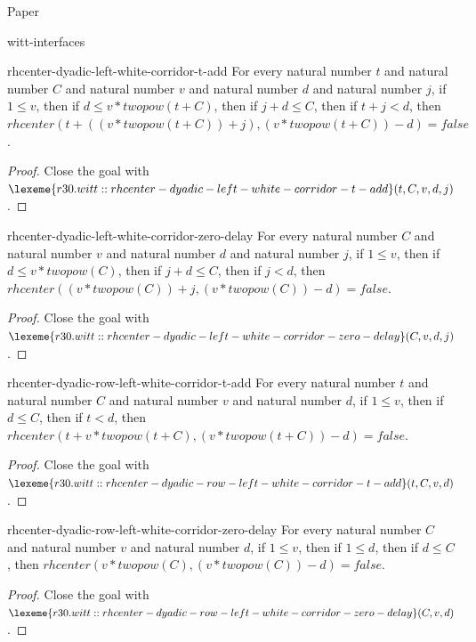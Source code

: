 \begin{lexlean}{Paper}
\begin{section}{witt-interfaces}
  \begin{theorem}{rhcenter-dyadic-left-white-corridor-t-add}
  For every natural number \(t\) and natural number \(C\) and natural number \(v\) and natural number \(d\) and natural number \(j\), if \(1 ≤ v\), then if \(d ≤ v * twopow(t + C)\), then if \(j + d ≤ C\), then if \(t + j < d\), then \(rhcenter(t + ((v * twopow(t + C)) + j), (v * twopow(t + C)) - d) = false\).
  \begin{proof}
  Close the goal with \(\lexeme{r30.witt::rhcenter-dyadic-left-white-corridor-t-add}(t, C, v, d, j)\).
  \end{proof}
  \end{theorem}

  \begin{theorem}{rhcenter-dyadic-left-white-corridor-zero-delay}
  For every natural number \(C\) and natural number \(v\) and natural number \(d\) and natural number \(j\), if \(1 ≤ v\), then if \(d ≤ v * twopow(C)\), then if \(j + d ≤ C\), then if \(j < d\), then \(rhcenter((v * twopow(C)) + j, (v * twopow(C)) - d) = false\).
  \begin{proof}
  Close the goal with \(\lexeme{r30.witt::rhcenter-dyadic-left-white-corridor-zero-delay}(C, v, d, j)\).
  \end{proof}
  \end{theorem}

  \begin{theorem}{rhcenter-dyadic-row-left-white-corridor-t-add}
  For every natural number \(t\) and natural number \(C\) and natural number \(v\) and natural number \(d\), if \(1 ≤ v\), then if \(d ≤ C\), then if \(t < d\), then \(rhcenter(t + v * twopow(t + C), (v * twopow(t + C)) - d) = false\).
  \begin{proof}
  Close the goal with \(\lexeme{r30.witt::rhcenter-dyadic-row-left-white-corridor-t-add}(t, C, v, d)\).
  \end{proof}
  \end{theorem}

  \begin{theorem}{rhcenter-dyadic-row-left-white-corridor-zero-delay}
  For every natural number \(C\) and natural number \(v\) and natural number \(d\), if \(1 ≤ v\), then if \(1 ≤ d\), then if \(d ≤ C\), then \(rhcenter(v * twopow(C), (v * twopow(C)) - d) = false\).
  \begin{proof}
  Close the goal with \(\lexeme{r30.witt::rhcenter-dyadic-row-left-white-corridor-zero-delay}(C, v, d)\).
  \end{proof}
  \end{theorem}


\end{section}
\end{lexlean}

